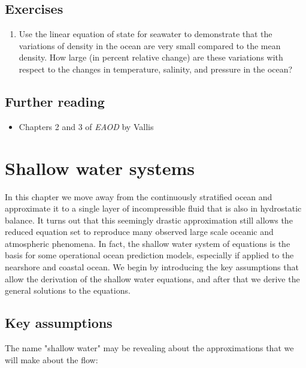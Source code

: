 \documentclass[12pt]{article}
\numberwithin{equation}{section}
\numberwithin{figure}{section}
\numberwithin{table}{section}
\begin{document}
\subsection{Exercises}

\begin{enumerate}
  \item Use the linear equation of state for seawater to demonstrate that the
  variations of density in the ocean are very small compared to the mean
  density. How large (in percent relative change) are these variations with
  respect to the changes in temperature, salinity, and pressure in the ocean?
\end{enumerate}

\subsection*{Further reading}

\begin{itemize}
  \item Chapters 2 and 3 of \textit{EAOD} by Vallis
\end{itemize}

\newpage
\section{Shallow water systems}
\label{sec:shallow_water_systems}

In this chapter we move away from the continuously stratified ocean and
approximate it to a single layer of incompressible fluid that is also in
hydrostatic balance.
It turns out that this seemingly drastic approximation still allows the
reduced equation set to reproduce many observed large scale oceanic and
atmospheric phenomena.
In fact, the shallow water system of equations is the basis for some operational
ocean prediction models, especially if applied to the nearshore and coastal
ocean.
We begin by introducing the key assumptions that allow the derivation of the
shallow water equations, and after that we derive the general solutions to the
equations.

\subsection{Key assumptions}

The name "shallow water" may be revealing about the approximations that we will
make about the flow:
\end{document}
